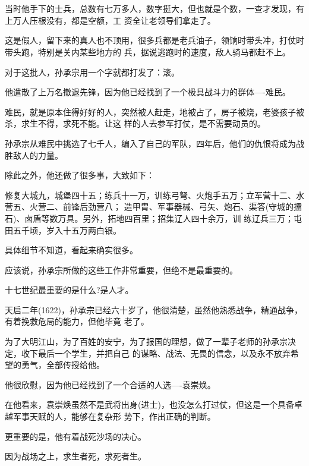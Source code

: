 \documentclass[11pt,a4paper,onecolumn]{article}
\begin{document}
\section[\thesection]{}

当时他手下的士兵，总数有七万多人，数字挺大，但也就是个数，一查才发现，有上万人压根没有，都是空额，工
资全让老领导们拿走了。

这是假人，留下来的真人也不顶用，很多兵都是老兵油子，领饷时带头冲，打仗时带头跑，特别是关内某些地方的
兵，据说逃跑时的速度，敌人骑马都赶不上。

对于这批人，孙承宗用一个字就都打发了：滚。

他遣散了上万名撤退先锋，因为他已经找到了一个极具战斗力的群体----难民。

难民，就是原本住得好好的人，突然被人赶走，地被占了，房子被烧，老婆孩子被杀，求生不得，求死不能。让这
样的人去参军打仗，是不需要动员的。

孙承宗从难民中挑选了七千人，编入了自己的军队，四年后，他们的仇恨将成为战胜敌人的力量。

除此之外，他还做了很多事，大致如下：

修复大城九，城堡四十五；练兵十一万，训练弓弩、火炮手五万；立军营十二、水营五、火营二、前锋后劲营八；
造甲胄、军事器械、弓矢、炮石、渠答(守城的擂石)、卤盾等数万具。另外，拓地四百里；招集辽人四十余万，训
练辽兵三万；屯田五千顷，岁入十五万两白银。

具体细节不知道，看起来确实很多。

应该说，孙承宗所做的这些工作非常重要，但绝不是最重要的。

十七世纪最重要的是什么?是人才。

天启二年(1622)，孙承宗已经六十岁了，他很清楚，虽然他熟悉战争，精通战争，有着挽救危局的能力，但他毕竟
老了。

为了大明江山，为了百姓的安宁，为了报国的理想，做了一辈子老师的孙承宗决定，收下最后一个学生，并把自己
的谋略、战法、无畏的信念，以及永不放弃希望的勇气，全部传授给他。

他很欣慰，因为他已经找到了一个合适的人选----袁崇焕。

在他看来，袁崇焕虽然不是武将出身(进士)，也没怎么打过仗，但这是一个具备卓越军事天赋的人，能够在复杂形
势下，作出正确的判断。

更重要的是，他有着战死沙场的决心。

因为战场之上，求生者死，求死者生。

\section[\thesection]{}
\end{document}
